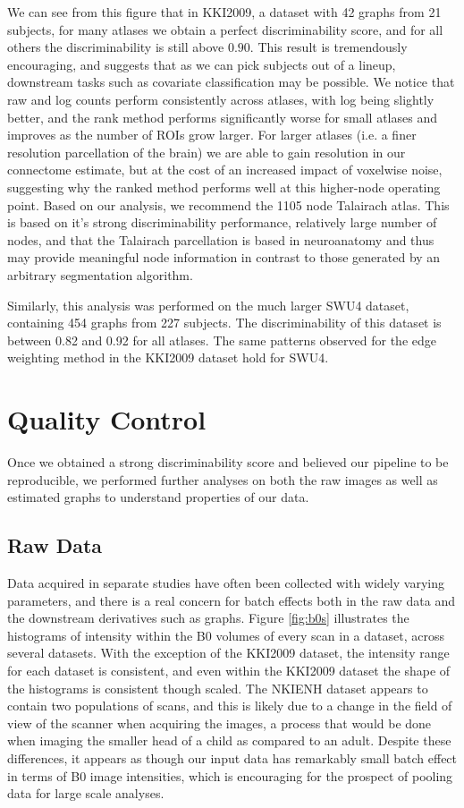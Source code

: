 We can see from this figure that in KKI2009, a dataset with 42 graphs from 21 subjects, for many atlases we obtain a perfect discriminability score, and for all others the discriminability is still above $0.90$. This result is tremendously encouraging, and suggests that as we can pick subjects out of a lineup, downstream tasks such as covariate classification may be possible. We notice that raw and log counts perform consistently across atlases, with log being slightly better, and the rank method performs significantly worse for small atlases and improves as the number of ROIs grow larger. For larger atlases (i.e. a finer resolution parcellation of the brain) we are able to gain resolution in our connectome estimate, but at the cost of an increased impact of voxelwise noise, suggesting why the ranked method performs well at this higher-node operating point. Based on our analysis, we recommend the 1105 node Talairach atlas. This is based on it's strong discriminability performance, relatively large number of nodes, and that the Talairach parcellation is based in neuroanatomy and thus may provide meaningful node information in contrast to those generated by an arbitrary segmentation algorithm.

Similarly, this analysis was performed on the much larger SWU4 dataset, containing 454 graphs from 227 subjects. The discriminability of this dataset is between 0.82 and 0.92 for all atlases. The same patterns observed for the edge weighting method in the KKI2009 dataset hold for SWU4.


\section{Quality Control}
Once we obtained a strong discriminability score and believed our pipeline to be reproducible, we performed further analyses on both the raw images as well as estimated graphs to understand properties of our data.

\subsection{Raw Data}
Data acquired in separate studies have often been collected with widely varying parameters, and there is a real concern for batch effects both in the raw data and the downstream derivatives such as graphs. Figure \ref{fig:b0s} illustrates the histograms of intensity within the B0 volumes of every scan in a dataset, across several datasets. With the exception of the KKI2009 dataset, the intensity range for each dataset is consistent, and even within the KKI2009 dataset the shape of the histograms is consistent though scaled. The NKIENH dataset appears to contain two populations of scans, and this is likely due to a change in the field of view of the scanner when acquiring the images, a process that would be done when imaging the smaller head of a child as compared to an adult. Despite these differences, it appears as though our input data has remarkably small batch effect in terms of B0 image intensities, which is encouraging for the prospect of pooling data for large scale analyses.

